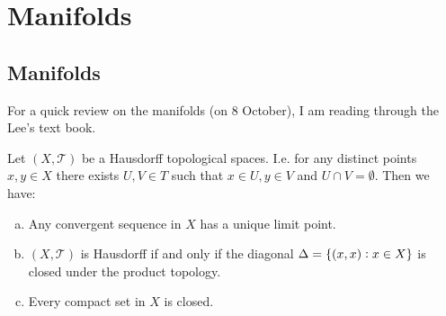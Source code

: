 \chapter{Manifolds}

\section{Manifolds}

For a quick review on the manifolds (on 8 October), I am reading through the Lee's text book.

\begin{proposition}
	Let $ (X,\mathcal{T}) $ be a Hausdorff topological spaces. I.e. for any distinct points $ x,y \in X $ there exists $ U,V \in T $ such that $ x \in U, y \in V $ and $ U\cap V = \emptyset $. Then we have:
	\begin{enumerate}[(a)]
		\item Any convergent sequence in $ X $ has a unique limit point.
		\item $ (X,\mathcal{T}) $ is Hausdorff if and only if the diagonal $ \Delta = \{(x,x): x \in X\} $ is closed under the product topology.
		\item Every compact set in $ X $ is closed.
	\end{enumerate}
	
\end{proposition}
